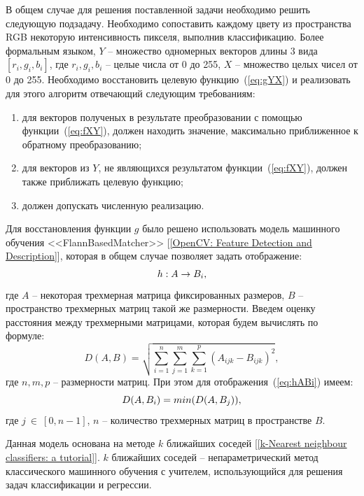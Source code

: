 \documentclass[14pt, a4paper]{extreport}
\begin{document}
	В общем случае для решения поставленной задачи необходимо решить следующую подзадачу. Необходимо сопоставить каждому цвету из пространства RGB некоторую интенсивность пикселя, выполнив классификацию. Более формальным языком, $Y$ -- множество одномерных векторов длины 3 вида $[r_i, g_i, b_i]$, где $r_i, g_i, b_i$ -- целые числа от 0 до 255, $X$ -- множество целых чисел от 0 до 255. Необходимо восстановить целевую функцию~(\ref{eq:gYX}) и реализовать для этого алгоритм отвечающий следующим требованиям:
	\begin{enumerate}[label={\arabic*)}]
		\item для векторов полученых в результате преобразовании с помощью функции~(\ref{eq:fXY}), должен находить значение, максимально приближенное к обратному преобразованию;
		\item для векторов из $Y$, не являющихся результатом функции~(\ref{eq:fXY}), должен также приближать целевую функцию;
		\item должен допускать численную реализацию.
	\end{enumerate}
	
	Для восстановления функции $g$ было решено использовать модель машинного обучения <<FlannBasedMatcher>> [\ref{OpenCV: Feature Detection and Description}], которая в общем случае позволяет задать отображение:
	\vspace*{-0.2cm}
	\begin{equation}
		h: A \rightarrow B_i,
		\label{eq:hABi}
		\vspace*{-0.4cm}
	\end{equation}
	где $A$ -- некоторая трехмерная матрица фиксированных размеров, $B$ -- пространство трехмерных матриц такой же размерности. Введем оценку расстояния между трехмерными матрицами, которая будем вычислять по формуле:
	\begin{equation*}
		D(A, B) = \sqrt{\sum\limits_{i=1}^n \sum\limits_{j=1}^m \sum\limits_{k=1}^p (A_{ijk} - B_{ijk})^2},
		\label{eq:D(A,B)}
	\end{equation*}
	где $n, m, p$ -- размерности матриц. При этом для отображения~(\ref{eq:hABi}) имеем:
	\vspace*{-0.2cm}
	\begin{equation*}
		D(A, B_i) = min(D(A, B_j)), 
		\label{eq:D(A,B_i)}
		\vspace*{-0.4cm}
	\end{equation*}
	где $j~\in~[0, n-1]$, $n$ -- количество трехмерных матриц в пространстве $B$. 
	
	Данная модель основана на методе $k$ ближайших соседей [\ref{k-Nearest neighbour classifiers: a tutorial}]. $k$ ближайших соседей -- непараметрический метод классического машинного обучения с учителем, использующийся для решения задач классификации и регрессии. 
	
\end{document}
